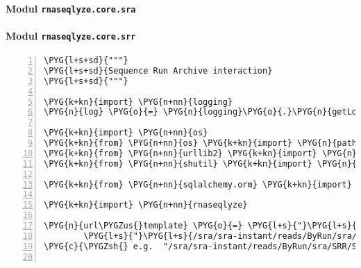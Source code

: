 \paragraph{Modul \texttt{rnaseqlyze.core.sra}}
\label{rnaseqlyze-pdf:modul-rnaseqlyze-core-sra}

\paragraph{Modul \texttt{rnaseqlyze.core.srr}}
\label{rnaseqlyze-pdf:modul-rnaseqlyze-core-srr}
\begin{Verbatim}[commandchars=\\\{\},numbers=left,firstnumber=1,stepnumber=5]
\PYG{l+s+sd}{"""}
\PYG{l+s+sd}{Sequence Run Archive interaction}
\PYG{l+s+sd}{"""}

\PYG{k+kn}{import} \PYG{n+nn}{logging}
\PYG{n}{log} \PYG{o}{=} \PYG{n}{logging}\PYG{o}{.}\PYG{n}{getLogger}\PYG{p}{(}\PYG{n}{\PYGZus{}\PYGZus{}name\PYGZus{}\PYGZus{}}\PYG{p}{)}

\PYG{k+kn}{import} \PYG{n+nn}{os}
\PYG{k+kn}{from} \PYG{n+nn}{os} \PYG{k+kn}{import} \PYG{n}{path}
\PYG{k+kn}{from} \PYG{n+nn}{urllib2} \PYG{k+kn}{import} \PYG{n}{urlopen}
\PYG{k+kn}{from} \PYG{n+nn}{shutil} \PYG{k+kn}{import} \PYG{n}{copyfileobj}

\PYG{k+kn}{from} \PYG{n+nn}{sqlalchemy.orm} \PYG{k+kn}{import} \PYG{n}{validates}

\PYG{k+kn}{import} \PYG{n+nn}{rnaseqlyze}

\PYG{n}{url\PYGZus{}template} \PYG{o}{=} \PYG{l+s}{"}\PYG{l+s}{http://ftp-private.ncbi.nlm.nih.gov}\PYG{l+s}{"} \PYGZbs{}
        \PYG{l+s}{"}\PYG{l+s}{/sra/sra-instant/reads/ByRun/sra/SRR/\PYGZob{}srr:.6\PYGZcb{}/\PYGZob{}srr\PYGZcb{}/\PYGZob{}srr\PYGZcb{}.sra}\PYG{l+s}{"}
\PYG{c}{\PYGZsh{} e.g.  "/sra/sra-instant/reads/ByRun/sra/SRR/SRR000/SRR000001/SRR000001.sra"}


\end{Verbatim}
